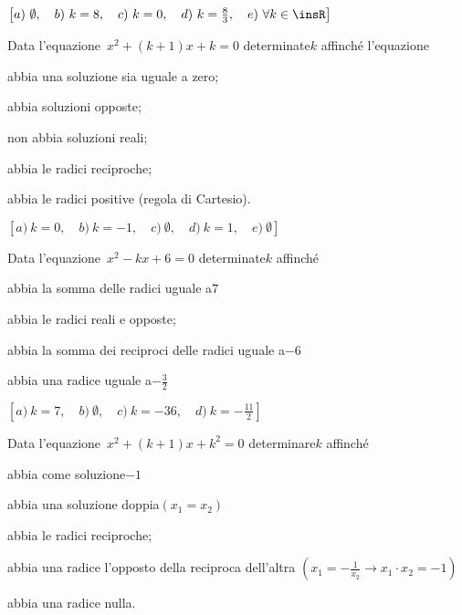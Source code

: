 \begin{flushright}
$\left[a)~\emptyset ,\quad b)~k = 8 ,\quad c)~ k = 0,\quad 
d)~k = \frac{8}{3} ,\quad e)~\forall k \in \insR\right]$
\end{flushright}

\begin{esercizio}[\Ast]
 \label{ese:3.99}
Data l'equazione~$x^{2} + (k + 1) x + k = 0$ determinate$k$ affinché 
l'equazione
\begin{enumeratea}
\item abbia una soluzione sia uguale a zero;~
\item abbia soluzioni opposte;~
\item non abbia soluzioni reali;~
\item abbia le radici reciproche;~
\item abbia le radici positive (regola di Cartesio).
\end{enumeratea}
\end{esercizio}

\begin{flushright}
$\left[a)~ k = 0 ,\quad b)~ k =-1 ,\quad c)~ \emptyset ,\quad 
d)~ k = 1 ,\quad e)~ \emptyset \right]$
\end{flushright}

\begin{esercizio}[\Ast]
 \label{ese:3.100}
Data l'equazione~$x^{2}-kx + 6 = 0$ determinate$k$ affinché
\begin{enumeratea}
\item abbia la somma delle radici uguale a$7$
\item abbia le radici reali e opposte;~
\item abbia la somma dei reciproci delle radici uguale a$-6$
\item abbia una radice uguale a$- \frac{3}{2}$
\end{enumeratea}
\end{esercizio}

\begin{flushright}
$\left[a)~ k = 7 ,\quad b)~ \emptyset ,\quad c)~ k =-36 ,\quad 
d)~ k =-\frac{11}{2} \right]$
\end{flushright}

\begin{esercizio}[\Ast]
 \label{ese:3.101}
Data l'equazione~$x^{2} + (k + 1) x + k^{2} = 0$ determinare$k$ affinché
\begin{enumeratea}
\item abbia come soluzione$-1$
\item abbia una soluzione doppia$(x_1 =x_2)$
\item abbia le radici reciproche;~
\item abbia una radice l'opposto della reciproca dell'altra 
$\left(x_1=-\frac{1}{x_2}\rightarrow x_1 \cdot x_2=-1\right)$
\item abbia una radice nulla.
\end{enumeratea}
\end{esercizio}

